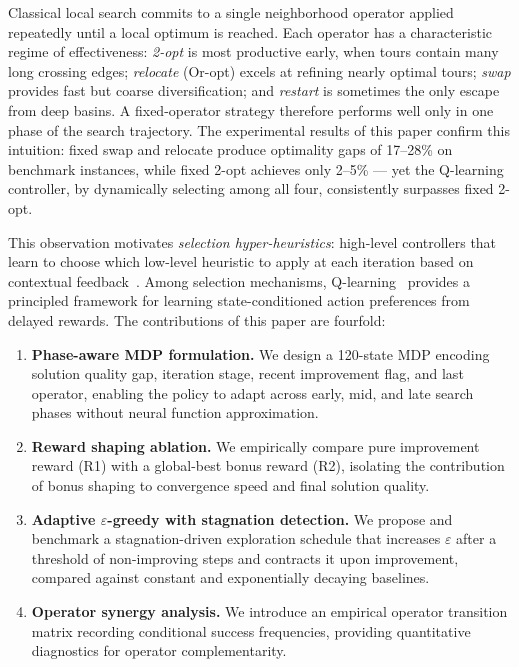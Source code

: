 \documentclass{article}
\begin{document}
Classical local search commits to a single neighborhood operator applied
repeatedly until a local optimum is reached. Each operator has a characteristic
regime of effectiveness: \textit{2-opt} is most productive early, when tours
contain many long crossing edges; \textit{relocate} (Or-opt) excels at refining
nearly optimal tours; \textit{swap} provides fast but coarse diversification;
and \textit{restart} is sometimes the only escape from deep basins. A
fixed-operator strategy therefore performs well only in one phase of the search
trajectory. The experimental results of this paper confirm this intuition: fixed
swap and relocate produce optimality gaps of 17--28\% on benchmark instances,
while fixed 2-opt achieves only 2--5\% --- yet the Q-learning controller, by
dynamically selecting among all four, consistently surpasses fixed 2-opt.

This observation motivates \textit{selection hyper-heuristics}: high-level
controllers that learn to choose which low-level heuristic to apply at each
iteration based on contextual feedback~\citep{burke2013hyper}. Among selection
mechanisms, Q-learning~\citep{watkins1992qlearning} provides a principled
framework for learning state-conditioned action preferences from delayed
rewards. The contributions of this paper are fourfold:

\begin{enumerate}
\item \textbf{Phase-aware MDP formulation.} We design a 120-state MDP encoding
solution quality gap, iteration stage, recent improvement flag, and last
operator, enabling the policy to adapt across early, mid, and late search phases
without neural function approximation.

\item \textbf{Reward shaping ablation.} We empirically compare pure improvement
reward (R1) with a global-best bonus reward (R2), isolating the contribution of
bonus shaping to convergence speed and final solution quality.

\item \textbf{Adaptive $\varepsilon$-greedy with stagnation detection.} We
propose and benchmark a stagnation-driven exploration schedule that increases
$\varepsilon$ after a threshold of non-improving steps and contracts it upon
improvement, compared against constant and exponentially decaying baselines.

\item \textbf{Operator synergy analysis.} We introduce an empirical operator
transition matrix recording conditional success frequencies, providing
quantitative diagnostics for operator complementarity.
\end{enumerate}
\end{document}
